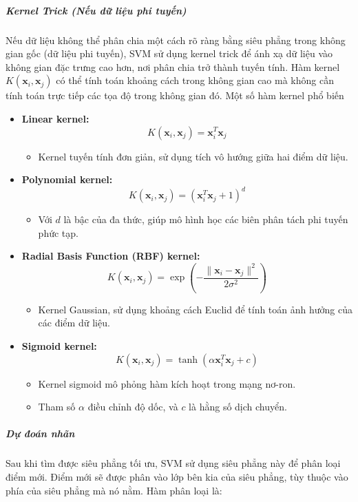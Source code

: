 \documentclass[a4paper,12pt]{article}
\begin{document}
\subparagraph{Kernel Trick (Nếu dữ liệu phi tuyến)}  
\hspace{5mm}Nếu dữ liệu không thể phân chia một cách rõ ràng bằng siêu phẳng trong không gian gốc (dữ liệu phi tuyến), SVM sử dụng kernel trick để ánh xạ dữ liệu vào không gian đặc trưng cao hơn, nơi phân chia trở thành tuyến tính. Hàm kernel \(K(\mathbf{x}_i, \mathbf{x}_j)\) có thể tính toán khoảng cách trong không gian cao mà không cần tính toán trực tiếp các tọa độ trong không gian đó. Một số hàm kernel phổ biến \cite{svm_kernel}

\begin{itemize}
    \item \textbf{Linear kernel:}
    \[
    K(\mathbf{x}_i, \mathbf{x}_j) = \mathbf{x}_i^T \mathbf{x}_j
    \]
    \begin{itemize}
        \item Kernel tuyến tính đơn giản, sử dụng tích vô hướng giữa hai điểm dữ liệu.
    \end{itemize}
    \item \textbf{Polynomial kernel:}
    \[
    K(\mathbf{x}_i, \mathbf{x}_j) = (\mathbf{x}_i^T \mathbf{x}_j + 1)^d
    \]
    \begin{itemize}
        \item Với \(d\) là bậc của đa thức, giúp mô hình học các biên phân tách phi tuyến phức tạp.
    \end{itemize}
    \item \textbf{Radial Basis Function (RBF) kernel:}
    \[
    K(\mathbf{x}_i, \mathbf{x}_j) = \exp\left(-\frac{\|\mathbf{x}_i - \mathbf{x}_j\|^2}{2\sigma^2}\right)
    \]
    \begin{itemize}
        \item Kernel Gaussian, sử dụng khoảng cách Euclid để tính toán ảnh hưởng của các điểm dữ liệu.
    \end{itemize}
    \item \textbf{Sigmoid kernel:}
    \[
    K(\mathbf{x}_i, \mathbf{x}_j) = \tanh\left(\alpha \mathbf{x}_i^T \mathbf{x}_j + c\right)
    \]
    \begin{itemize}
        \item Kernel sigmoid mô phỏng hàm kích hoạt trong mạng nơ-ron.
        \item Tham số \(\alpha\) điều chỉnh độ dốc, và \(c\) là hằng số dịch chuyển.
    \end{itemize}
\end{itemize}


\subparagraph{Dự đoán nhãn}  
\hspace{5mm}Sau khi tìm được siêu phẳng tối ưu, SVM sử dụng siêu phẳng này để phân loại điểm mới. Điểm mới sẽ được phân vào lớp bên kia của siêu phẳng, tùy thuộc vào phía của siêu phẳng mà nó nằm. Hàm phân loại là:
\end{document}
